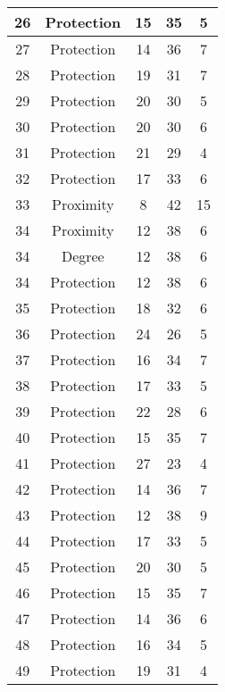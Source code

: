 \documentclass[results.tex]{subfiles}
\begin{document}
\begin{center}
\begin{tabular}{| c || c | c | c | c |}
    \hline
    26 & Protection & 15 & 35 & 5 \\ 
    \hline
    27 & Protection & 14 & 36 & 7 \\ 
    \hline
    28 & Protection & 19 & 31 & 7 \\ 
    \hline
    29 & Protection & 20 & 30 & 5 \\ 
    \hline
    30 & Protection & 20 & 30 & 6 \\ 
    \hline
    31 & Protection & 21 & 29 & 4 \\ 
    \hline
    32 & Protection & 17 & 33 & 6 \\ 
    \hline
    33 & Proximity & 8 & 42 & 15 \\ 
    \hline
    34 & Proximity & 12 & 38 & 6 \\ 
    \hline
    34 & Degree & 12 & 38 & 6 \\ 
    \hline
    34 & Protection & 12 & 38 & 6 \\ 
    \hline
    35 & Protection & 18 & 32 & 6 \\ 
    \hline
    36 & Protection & 24 & 26 & 5 \\ 
    \hline
    37 & Protection & 16 & 34 & 7 \\ 
    \hline
    38 & Protection & 17 & 33 & 5 \\ 
    \hline
    39 & Protection & 22 & 28 & 6 \\ 
    \hline
    40 & Protection & 15 & 35 & 7 \\ 
    \hline
    41 & Protection & 27 & 23 & 4 \\ 
    \hline
    42 & Protection & 14 & 36 & 7 \\ 
    \hline
    43 & Protection & 12 & 38 & 9 \\ 
    \hline
    44 & Protection & 17 & 33 & 5 \\ 
    \hline
    45 & Protection & 20 & 30 & 5 \\ 
    \hline
    46 & Protection & 15 & 35 & 7 \\ 
    \hline
    47 & Protection & 14 & 36 & 6 \\ 
    \hline
    48 & Protection & 16 & 34 & 5 \\ 
    \hline
    49 & Protection & 19 & 31 & 4 \\ 
    \hline   \end{tabular}
\end{center}
\end{document}
